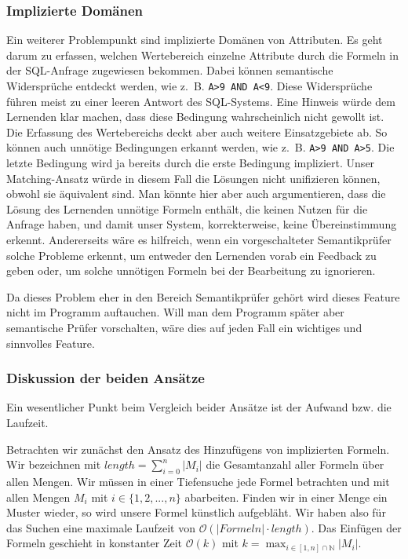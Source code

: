 \subsubsection{Implizierte Domänen}

Ein weiterer Problempunkt sind implizierte Domänen von Attributen. Es geht darum zu erfassen, welchen Wertebereich einzelne Attribute durch die Formeln in der SQL-Anfrage zugewiesen bekommen. Dabei können semantische Widersprüche entdeckt werden, wie \mbox{z. B.} \verb|A>9 AND A<9|. Diese Widersprüche führen meist zu einer leeren Antwort des SQL-Systems. Eine Hinweis würde dem Lernenden klar machen, dass diese Bedingung wahrscheinlich nicht gewollt ist. Die Erfassung des Wertebereichs deckt aber auch weitere Einsatzgebiete ab. So können auch unnötige Bedingungen erkannt werden, wie \mbox{z. B.} \verb|A>9 AND A>5|. Die letzte Bedingung wird ja bereits durch die erste Bedingung impliziert. Unser Matching-Ansatz würde in diesem Fall die Lösungen nicht unifizieren können, obwohl sie äquivalent sind. Man könnte hier aber auch argumentieren, dass die Lösung des Lernenden unnötige Formeln enthält, die keinen Nutzen für die Anfrage haben, und damit unser System, korrekterweise, keine Übereinstimmung erkennt. Andererseits wäre es hilfreich, wenn ein vorgeschalteter Semantikprüfer solche Probleme erkennt, um entweder den Lernenden vorab ein Feedback zu geben oder, um solche unnötigen Formeln bei der Bearbeitung zu ignorieren. 

Da dieses Problem eher in den Bereich Semantikprüfer gehört wird dieses Feature nicht im Programm auftauchen. Will man dem Programm später aber semantische Prüfer vorschalten, wäre dies auf jeden Fall ein wichtiges und sinnvolles Feature.

\subsubsection{Diskussion der beiden Ansätze}

Ein wesentlicher Punkt beim Vergleich beider Ansätze ist der Aufwand bzw. die Laufzeit. 

Betrachten wir zunächst den Ansatz des Hinzufügens von implizierten Formeln. Wir bezeichnen mit $length = \sum_{i=0}^n \vert M_i\vert$ die Gesamtanzahl aller Formeln über allen Mengen. Wir müssen in einer Tiefensuche jede Formel betrachten und mit allen Mengen $M_i$ mit $i\in \{1,2,...,n\}$ abarbeiten. Finden wir in einer Menge ein Muster wieder, so wird unsere Formel künstlich aufgebläht. Wir haben also für das Suchen eine maximale Laufzeit von $\mathcal{O}(\mathit{\vert Formeln\vert \cdot length})$. Das Einfügen der Formeln geschieht in konstanter Zeit $\mathcal{O}(k)$ mit $k= \max_{i\in [1,n]\cap \mathbb{N}} \vert M_i\vert$.

